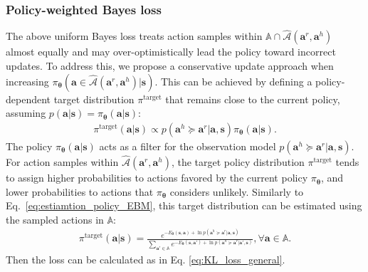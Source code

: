 \subsubsection{Policy-weighted Bayes loss}
\label{sec:sub:sub_poicy_weighted_Bayesloss}
The above uniform Bayes loss treats action samples within $\mathbb{A} \cap \hat{ \mathcal{A}}{(\bm a^r, \bm a^h)}$ almost equally and may over-optimistically lead the policy toward incorrect updates.
To address this, we propose a conservative update approach when increasing $\pi_{\bm \theta}(\bm a \in \hat{ \mathcal{A}}{(\bm a^r, \bm a^h)}  | \bm s)$.
This can be achieved by defining a policy-dependent target distribution $\pi^{\text{target}}$ that remains close to the current policy, assuming $p(\bm a| \bm s) = \pi_{\bm \theta}(\bm a| \bm s)$:
\begin{align}
\pi^{\text{target}}(\bm a| \bm s)  \propto \! { p (\bm a^h \!\succeq\! \bm a^r | \bm a ,\bm s) \pi_{\bm \theta}(\bm a | \bm s)}.\!\! 
\end{align}
The policy $\pi_{\bm \theta}(\bm a | \bm s)$ acts as a filter for the observation model  $p (\bm a^h \succeq \bm a^r | \bm a,\bm s)$. 
For action samples within $\hat{ \mathcal{A}}{(\bm a^r, \bm a^h)}$, the target policy distribution $\pi^{\text{target}}$ tends to assign higher probabilities to actions favored by the current policy $ \pi_{\bm \theta}$, and lower probabilities to actions that $\pi_{\bm \theta}$ considers unlikely.
Similarly to Eq.~\eqref{eq:estiamtion_policy_EBM}, this target distribution can be estimated using the sampled actions in $\mathbb A$:
\begin{align}
  \pi^{\text{target}}(\bm a| \bm s) \!= \!
   \frac{e^{-E_{\bm \theta}(\bm{s},\bm{a}) + \ln p(\bm{a}^h \succeq \bm{a}^r | \bm{a}, \bm s)}}{\sum_{\bm{a}' \in \mathbb{A}} e^{-E_{\bm \theta}(\bm{s},\bm{a}') + \ln p(\bm{a}^h \succeq \bm{a}^r | \bm{a}', \bm s)}}, \! \forall\bm a \!\in  \! \mathbb A.\!\!\!
\end{align}
Then the loss can be calculated as in Eq. \eqref{eq:KL_loss_general}. 
 





